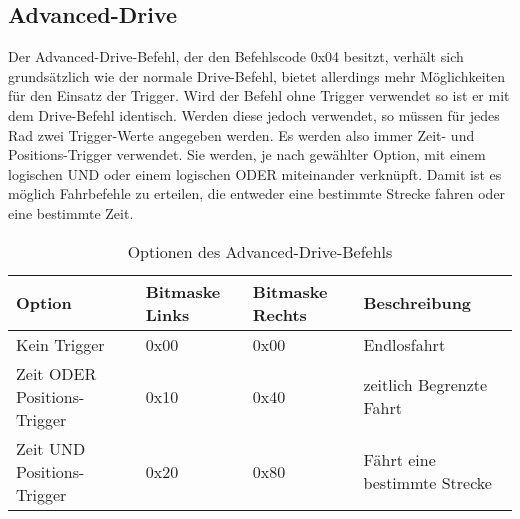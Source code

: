 \subsection{Advanced-Drive}
Der Advanced-Drive-Befehl, der den Befehlscode 0x04 besitzt, verhält sich grundsätzlich wie der normale Drive-Befehl, bietet
allerdings mehr Möglichkeiten für den Einsatz der Trigger. Wird der Befehl ohne Trigger
verwendet so ist er mit dem Drive-Befehl identisch. Werden diese jedoch verwendet, so
müssen für jedes Rad zwei Trigger-Werte angegeben werden. Es werden also immer Zeit-
und Positions-Trigger verwendet. Sie werden, je nach gewählter Option, mit einem logischen
UND oder einem logischen ODER miteinander verknüpft. Damit ist es möglich Fahrbefehle
zu erteilen, die entweder eine bestimmte Strecke fahren oder eine bestimmte Zeit.
\begin{table}[htb]
\begin{center}
	\begin{tabularx}{\linewidth}{|X|l|l|X|}
		\hline
		\textbf{Option} & \textbf{Bitmaske Links} & \textbf{Bitmaske Rechts} & \textbf{Beschreibung} \\
		\hline
		\hline
		Kein Trigger				& 0x00						   & 0x00						   & Endlosfahrt \\
		\hline
		Zeit ODER Positions-Trigger	& 0x10						   & 0x40						   & zeitlich Begrenzte Fahrt\\
		\hline
		Zeit UND Positions-Trigger  & 0x20						   & 0x80						   & Fährt eine bestimmte Strecke \\
		\hline
	\end{tabularx}
	\caption{\label{protocol_advanced_drive} Optionen des Advanced-Drive-Befehls}
\end{center}
\end{table}

